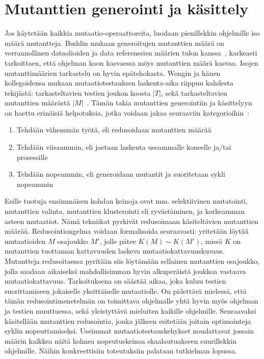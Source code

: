 \documentclass[finnish]{tktltiki2}
\begin{document}
\section{Mutanttien generointi ja käsittely}
Jos käytetään kaikkia mutaatio-operaattoreita, luodaan pienillekkin ohjelmille iso määrä mutantteja. Buddin mukaan generoitujen mutanttien määrä on verrannollinen dataolioiden ja data referenssien määrien tulon kanssa~\cite{Budd}, karkeasti tarkoittaen, että ohjelman koon kasvaessa möys mutanttien määrä kasvaa. Isojen mutanttimäärien tarkastelu on hyvin epätehokasta. Wongin ja hänen kollegoidensa mukaan mutaatiotestauksen laskenta-aika riippuu kahdesta tekijästä: tarkasteltavien testien joukon koosta $|T|$, sekä tarkasteltavien mutanttien määrästä $|M|$~\cite{}. Tämän takia mutanttien generointiin ja käsittelyyn on haettu erinäisiä helpotuksia, jotka voidaan jakaa seuraaviin kategorioihin~\cite{Hussain08}:
\begin{enumerate}
\item Tehdään vähemmän työtä, eli redusoidaan mutanttien määrää
\item Tehdään viisaammin, eli jaetaan laskenta useammalle koneelle ja/tai prosessille
\item Tehdään nopeammin, eli generoidaan mutantit ja suoritetaan sykli nopeammin
\end{enumerate}
Esille tuotuja ensimmäisen kohdan keinoja ovat mm. selektiivinen mutatointi, mutanttien valinta, mutanttien klusterointi eli ryvästäminen, ja korkeamman asteen mutaatiot. Nämä tekniikat pyrkivät redusoimaan käsiteltävien mutanttien määrää. Redusointiongelma voidaan formalisoida seuraavasti: yritetään löytää mutaatioiden $M$ osajoukko $M'$, jolle pätee $K(M) \sim K(M')$, missä $K$ on mutanttien tuottaman kattavuuden laskeva mutaatiokattavuuskuvaus. Mutantteja redusoitaessa pyritään siis löytämään sellainen mutanttien osajoukko, jolla saadaan aikaiseksi mahdollisimman hyvin alkuperäistä joukkoa vastaava mutaatiokattavuus. Tarkoituksena on säästää aikaa, joka kuluu testien suorittamiseen jokaiselle yksittäiselle mutaatiolle. On pidettävä mielessä, että tämän redusointimenetelmän on toimittava ohjelmalle yhtä hyvin myös ohjelman ja testien muuttuessa, sekä yleistyttävä mieluiten kaikille ohjelmille. Seuraavaksi käsitellään mutanttien redusointia, jonka jälkeen esitetään joitain optimointeja syklin nopeuttamiseksi. Useimmat mutaatiotestauskehykset noudattavat jossain määrin kaikkea näitä kolmea nopeutuskeinoa skaalautuakseen suurillekkin ohjelmille. Näihin konkreettisiin toteutuksiin palataan tutkielman lopussa.
\end{document}

